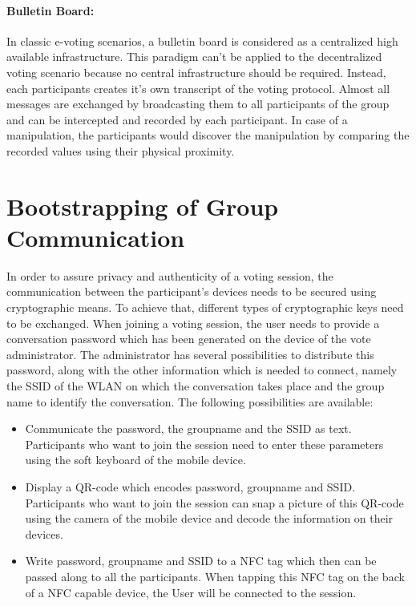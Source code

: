 \documentclass[numbers=noenddot, abstract=on, a4paper, headsepline,
footsepline, oneside, draft=off]{scrreprt}
\begin{document}
\paragraph{Bulletin Board:} In classic e-voting scenarios, a bulletin board is
considered as a centralized high available infrastructure. This paradigm can't
be applied to the decentralized voting scenario because no central
infrastructure should be required. Instead, each participants creates it's own
transcript of the voting protocol. Almost all messages are exchanged by
broadcasting them to all participants of the group and can be intercepted and
recorded by each participant. In case of a manipulation, the participants would
discover the manipulation by comparing the recorded values using their physical
proximity.


\section{Bootstrapping of Group Communication}
\label{sec:bootstraping}
In order to assure privacy and authenticity of a voting session, the
communication between the participant's devices needs to be secured using
cryptographic means. To achieve that, different types of cryptographic keys need
to be exchanged. When joining a voting session, the user needs to provide a
conversation password which has been generated on the device of the vote
administrator. The administrator has several possibilities to distribute this
password, along with the other information which is needed to connect, namely
the SSID of the WLAN on which the conversation takes place and the group name to
identify the conversation. The following possibilities are available:
\begin{itemize}
  \item Communicate the password, the groupname and the SSID as text.
  Participants who want to join the session need to enter these parameters using
  the soft keyboard of the mobile device.
  \item Display a QR-code which encodes password, groupname and SSID.
  Participants who want to join the session can snap a picture of this QR-code
  using the camera of the mobile device and decode the information on their
  devices.
  \item Write password, groupname and SSID to a NFC tag which then can be passed
  along to all the participants. When tapping this NFC tag on the back of a NFC
  capable device, the User will be connected to the session.
\end{itemize}
\end{document}
